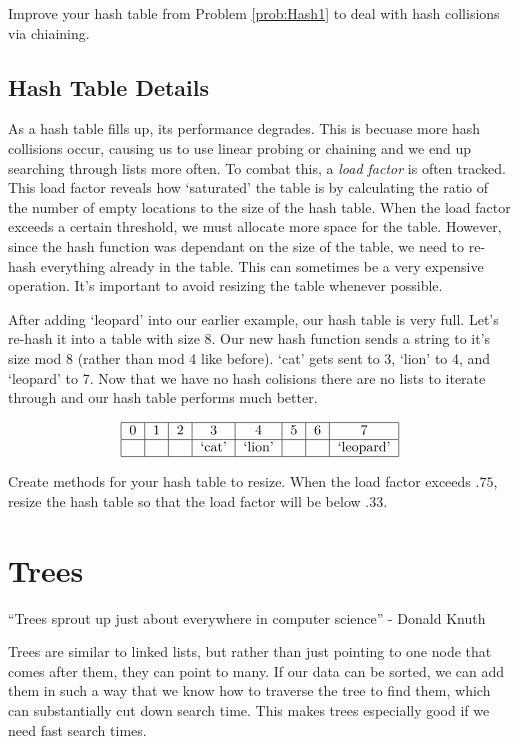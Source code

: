 \begin{problem}
Improve your hash table from Problem \ref{prob:Hash1} to deal with hash collisions via chiaining.
\end{problem}

\subsection*{Hash Table Details}
As a hash table fills up, its performance degrades.
This is becuase more hash collisions occur, causing us to use linear probing or chaining and we end up searching through lists more often.
To combat this, a \emph{load factor} is often tracked.
This load factor reveals how `saturated' the table is by calculating the ratio of the number of empty locations to the size of the hash table.
When the load factor exceeds a certain threshold, we must allocate more space for the table.
However, since the hash function was dependant on the size of the table, we need to re-hash everything already in the table. 
This can sometimes be a very expensive operation.
It's important to avoid resizing the table whenever possible.

After adding `leopard' into our earlier example, our hash table is very full. Let's re-hash it into a table with size 8.
Our new hash function sends a string to it's size mod 8 (rather than mod 4 like before).
`cat' gets sent to 3, `lion' to 4, and `leopard' to 7. 
Now that we have no hash colisions there are no lists to iterate through and our hash table performs much better.

\[
\begin{tabular}{|c|c|c|c|c|c|c|c|}
\hline
0 & 1 & 2 & 3 & 4 & 5 & 6 & 7 \\
\hline
 & & & `cat' & `lion' & & &`leopard' \\
\hline
\end{tabular}
\]

\begin{problem}
Create methods for your hash table to resize.
When the load factor exceeds $.75$, resize the hash table so that the load factor will be below $.33$.
\label{prob:Hash3}
\end{problem}

\section*{Trees}
``Trees sprout up just about everywhere in computer science'' - Donald Knuth

Trees are similar to linked lists, but rather than just pointing to one node that comes after them, they can point to many.
If our data can be sorted, we can add them in such a way that we know how to traverse the tree to find them, which can substantially cut down search time.
This makes trees especially good if we need fast search times.

